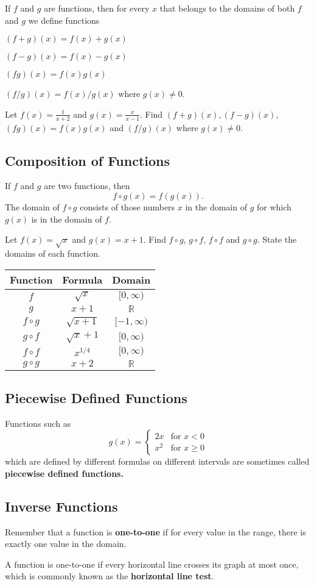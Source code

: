 \documentclass[../main.tex]{subfiles}
\begin{document}
If $f$ and $g$ are functions, then for every $x$ that belongs to the domains
of both $f$ and $g$ we define functions

$(f+g)(x)=f(x)+g(x)$

$(f-g)(x)=f(x)-g(x)$

$(fg)(x)=f(x)g(x)$

$(f/g)(x)=f(x)/g(x)$ where $g(x)\neq 0.$

\begin{example}
Let $f(x)=\frac{1}{x+2}$ and $g(x)=\frac{x}{x-1}$. Find $(f+g)(x),(f-g)(x),$
$(fg)(x)=f(x)g(x)$ and $(f/g)(x)$ where $g(x)\neq 0.$
\end{example}

\subsection*{Composition of Functions}
If $f$ and $g$ are two functions, then
\[
  f\circ g(x)=f(g(x)).
\]
The domain of $f\circ g$ consists of those numbers $x$
in the domain of $g$ for which $g(x)$ is in the domain of $f$.


\begin{example}
Let $f(x)=\sqrt{x}$ and $g(x) = x+1$. Find $f\circ g$, $g \circ f$, $f \circ f$ and $g \circ g$. State the domains of each function.

\begin{table}[H]
  \centering
  \begin{tabular}{c c c}
    \hline
    Function & Formula & Domain \\
    \hline
    $f$ & $\sqrt{x}$ & $[0, \infty)$ \\
    $g$ & $x+1$ & $\mathbb{R}$ \\
    $f \circ g$ & $\sqrt{x+1}$ & $[-1, \infty)$ \\
    $g \circ f$ & $\sqrt{x}+1$ & $[0, \infty)$ \\
    $f \circ f$ & $x^{1/4}$ & $[0, \infty)$ \\
    $g \circ g$ & $x+2$ & $\mathbb{R}$ \\
    \hline
  \end{tabular}
\end{table}
\end{example}


\subsection*{Piecewise Defined Functions}
Functions such as
\[
g(x) =
\begin{cases}
    2x & \text{for } x<0 \\
    x^2 & \text{for }x\geq0
\end{cases}
\]
which are defined by different formulas on different intervals are sometimes called \textbf{piecewise defined functions.}

\subsection*{Inverse Functions}
Remember that a function is \textbf{one-to-one} if for every value in the range, there is exactly one value in the domain.

A function is one-to-one if every horizontal line crosses its graph at most once, which is commonly known as the \textbf{horizontal line test}.
\end{document}

